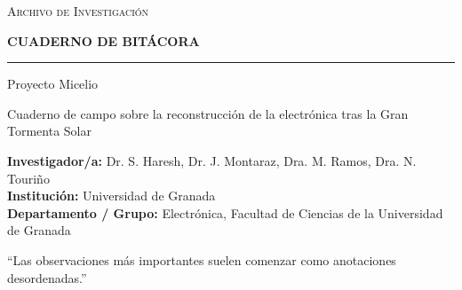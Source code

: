\documentclass[a4paper,12pt]{article}
\begin{document}
\begin{center}


{\Large\scshape Archivo de Investigación}

\vspace{1cm}

{\Huge\bfseries CUADERNO DE BITÁCORA}

\vspace{0.5cm}

\rule{0.75\textwidth}{0.6pt}

\vspace{0.8cm}

{\LARGE
Proyecto Micelio

}

\vspace{0.5cm}

{\large
Cuaderno de campo sobre la reconstrucción de la electrónica tras la Gran Tormenta Solar
}

\vspace{2cm}


\begin{minipage}{0.75\textwidth}


\textbf{Investigador/a:} Dr. S. Haresh, Dr. J. Montaraz, Dra. M. Ramos, Dra. N. Touriño \\[0.6cm]

\textbf{Institución:} Universidad de Granada \\[0.6cm]

\textbf{Departamento / Grupo:} Electrónica, Facultad de Ciencias de la Universidad de Granada \\[0.6cm]


\end{minipage}

\vfill



\vspace{1.2cm}

{\small
``Las observaciones más importantes suelen comenzar como anotaciones desordenadas.''
}

\end{center}
\end{document}
